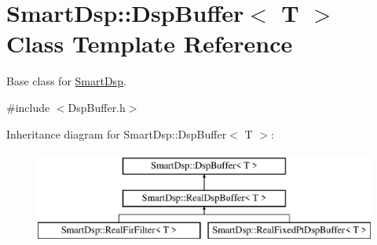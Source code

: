 \hypertarget{class_smart_dsp_1_1_dsp_buffer}{\section{Smart\+Dsp\+:\+:Dsp\+Buffer$<$ T $>$ Class Template Reference}
\label{class_smart_dsp_1_1_dsp_buffer}
}


Base class for \hyperlink{namespace_smart_dsp}{Smart\+Dsp}.  




{\ttfamily \#include $<$Dsp\+Buffer.\+h$>$}

Inheritance diagram for Smart\+Dsp\+:\+:Dsp\+Buffer$<$ T $>$\+:\begin{figure}[H]
\begin{center}
\leavevmode
\includegraphics[height=3.000000cm]{class_smart_dsp_1_1_dsp_buffer}
\end{center}
\end{figure}
